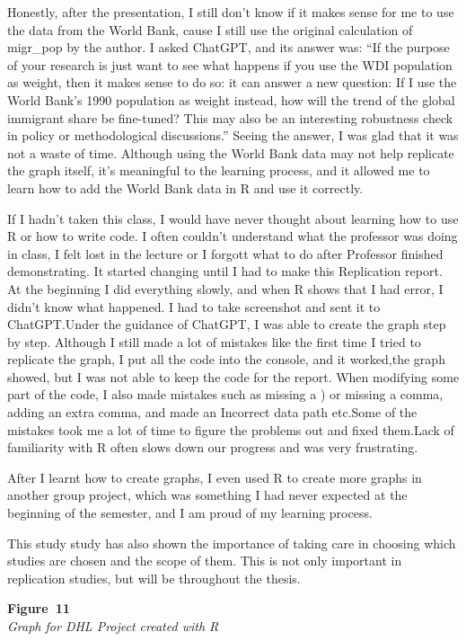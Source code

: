 \documentclass[
  man,
  floatsintext,
  longtable,
  nolmodern,
  notxfonts,
  notimes,
  colorlinks=true,linkcolor=blue,citecolor=blue,urlcolor=blue]{apa7}
\begin{document}
Honestly, after the presentation, I still don't know if it makes sense
for me to use the data from the World Bank, cause I still use the
original calculation of migr\_pop by the author. I asked ChatGPT, and
its answer was: ``If the purpose of your research is just want to see
what happens if you use the WDI population as weight, then it makes
sense to do so: it can answer a new question: If I use the World Bank's
1990 population as weight instead, how will the trend of the global
immigrant share be fine-tuned? This may also be an interesting
robustness check in policy or methodological discussions.'' Seeing the
answer, I was glad that it was not a waste of time. Although using the
World Bank data may not help replicate the graph itself, it's meaningful
to the learning process, and it allowed me to learn how to add the World
Bank data in R and use it correctly.

If I hadn't taken this class, I would have never thought about learning
how to use R or how to write code. I often couldn't understand what the
professor was doing in class, I felt lost in the lecture or I forgott
what to do after Professor finished demonstrating. It started changing
until I had to make this Replication report. At the beginning I did
everything slowly, and when R shows that I had error, I didn't know what
happened. I had to take screenshot and sent it to ChatGPT.Under the
guidance of ChatGPT, I was able to create the graph step by step.
Although I still made a lot of mistakes like the first time I tried to
replicate the graph, I put all the code into the console, and it
worked,the graph showed, but I was not able to keep the code for the
report. When modifying some part of the code, I also made mistakes such
as missing a ) or missing a comma, adding an extra comma, and made an
Incorrect data path etc.Some of the mistakes took me a lot of time to
figure the problems out and fixed them.Lack of familiarity with R often
slows down our progress and was very frustrating.

After I learnt how to create graphs, I even used R to create more graphs
in another group project, which was something I had never expected at
the beginning of the semester, and I am proud of my learning process.

This study study has also shown the importance of taking care in
choosing which studies are chosen and the scope of them. This is not
only important in replication studies, but will be throughout the
thesis.

\label{fig:dhl}
\textbf{Figure~11}\\
\emph{Graph for DHL Project created with R}
\end{document}
